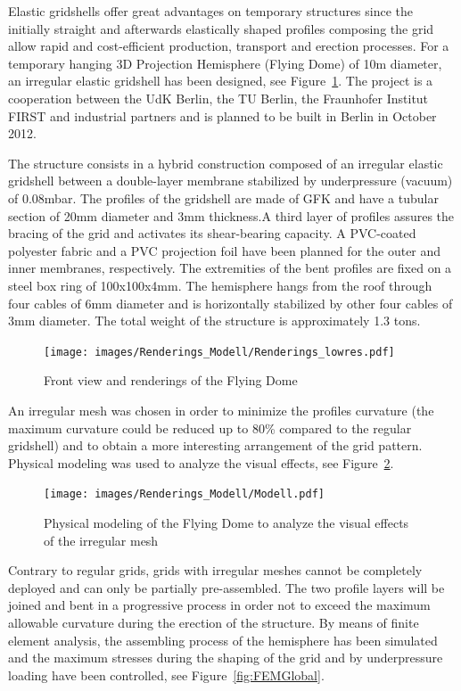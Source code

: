 \documentclass[Thesis.tex]{subfiles}
\begin{document}
Elastic gridshells offer great advantages on temporary structures since the initially straight and afterwards elastically shaped profiles composing the grid allow rapid and cost-efficient production, transport and erection processes. For a temporary hanging 3D Projection Hemisphere (Flying Dome) of 10m diameter, an irregular elastic gridshell has been designed, see Figure~\ref{fig:Renderings}. The project is a cooperation between the UdK Berlin, the TU Berlin, the Fraunhofer Institut FIRST and industrial partners and is planned to be built in Berlin in October 2012.

The structure consists in a hybrid construction composed of an irregular elastic gridshell between a double-layer membrane stabilized by underpressure (vacuum) of 0.08mbar. The profiles of the gridshell are made of GFK and have a tubular section of 20mm diameter and 3mm thickness.A third layer of profiles assures the bracing of the grid and activates its shear-bearing capacity. A PVC-coated polyester fabric and a PVC projection foil have been planned for the outer and inner membranes, respectively. The extremities of the bent profiles are fixed on a steel box ring of 100x100x4mm. The hemisphere hangs from the roof through four cables of 6mm diameter and is horizontally stabilized by other four cables of 3mm diameter. The total weight of the structure is approximately 1.3 tons.

\begin{figure}
\centering
\texttt{[image: images/Renderings\_Modell/Renderings\_lowres.pdf]}
\caption{Front view and renderings of the Flying Dome}
\label{fig:Renderings}
\end{figure}

An irregular mesh was chosen in order to minimize the profiles curvature (the maximum curvature could be reduced up to 80\% compared to the regular gridshell) and to obtain a more interesting arrangement of the grid pattern. Physical modeling was used to analyze the visual effects, see Figure~\ref{fig:Modell}. 

\begin{figure}
\centering
\texttt{[image: images/Renderings\_Modell/Modell.pdf]}
\caption{Physical modeling of the Flying Dome to analyze the visual effects of the irregular mesh}
\label{fig:Modell}
\end{figure}

Contrary to regular grids, grids with irregular meshes cannot be completely deployed and can only be partially pre-assembled. The two profile layers will be joined and bent in a progressive process in order not to exceed the maximum allowable curvature during the erection of the structure. By means of finite element analysis, the assembling process of the hemisphere has been simulated and the maximum stresses during the shaping of the grid and by underpressure loading have been controlled, see Figure~\ref{fig:FEMGlobal}. 
\end{document}
